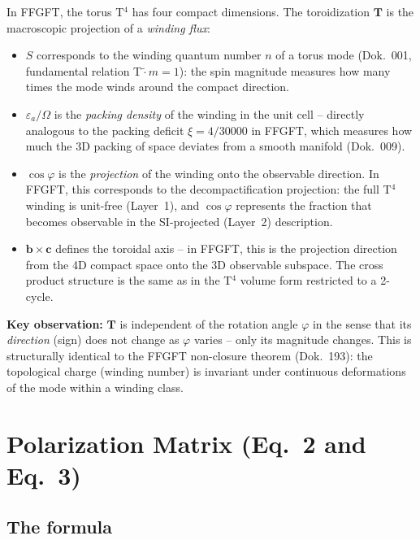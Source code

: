 In FFGFT, the torus T$^4$ has four compact dimensions. The toroidization
$\mathbf{T}$ is the macroscopic projection of a \emph{winding flux}:
\begin{itemize}
  \item $S$ corresponds to the winding quantum number $n$ of a torus mode
        (Dok.~001, fundamental relation T$\tilde{\cdot}m=1$): the spin
        magnitude measures how many times the mode winds around the compact
        direction.
  \item $\varepsilon_a/\Omega$ is the \emph{packing density} of the winding
        in the unit cell -- directly analogous to the packing deficit
        $\xi = 4/30000$ in FFGFT, which measures how much the 3D packing
        of space deviates from a smooth manifold (Dok.~009).
  \item $\cos\varphi$ is the \emph{projection} of the winding onto the
        observable direction. In FFGFT, this corresponds to the
        decompactification projection: the full T$^4$ winding is
        unit-free (Layer~1), and $\cos\varphi$ represents the fraction
        that becomes observable in the SI-projected (Layer~2) description.
  \item $\mathbf{b}\times\mathbf{c}$ defines the toroidal axis -- in FFGFT,
        this is the projection direction from the 4D compact space onto the
        3D observable subspace. The cross product structure is the same as
        in the T$^4$ volume form restricted to a 2-cycle.
\end{itemize}

\noindent\textbf{Key observation:} $\mathbf{T}$ is independent of the
rotation angle $\varphi$ in the sense that its \emph{direction} (sign) does
not change as $\varphi$ varies -- only its magnitude changes. This is
structurally identical to the FFGFT non-closure theorem (Dok.~193): the
topological charge (winding number) is invariant under continuous
deformations of the mode within a winding class.

\section{Polarization Matrix (Eq.~2 and Eq.~3)}

\subsection*{The formula}

